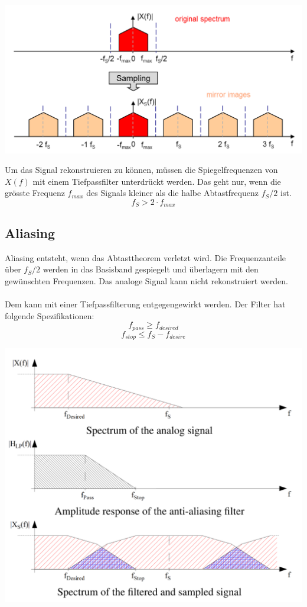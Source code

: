 \begin{center}
	\includegraphics[scale=.7]{./images/frequenz_spectrum}
\end{center}
Um das Signal rekonstruieren zu können, müssen die Spiegelfrequenzen von $X(f)$
mit einem Tiefpassfilter unterdrückt werden. Das geht nur, wenn die grösste
Frequenz $f_{max}$ des Signals kleiner als die halbe Abtastfrequenz $f_S/2$ ist.
\[ f_S > 2 \cdot f_{max} \]

\subsection{Aliasing}
Aliasing entsteht, wenn das Abtasttheorem verletzt wird. Die Frequenzanteile
über $f_S/2$ werden in das Basisband gespiegelt und überlagern mit den 
gewünschten Frequenzen. Das analoge Signal kann nicht rekonstruiert werden.\\
\\
Dem kann mit einer Tiefpassfilterung entgegengewirkt werden. Der Filter hat
folgende Spezifikationen:
\[ f_{pass} \geq f_{desired} \]
\[ f_{stop} \leq f_S - f_{desire} \]

\begin{center}
	\includegraphics[scale=.7]{./images/aliasing}
\end{center}

